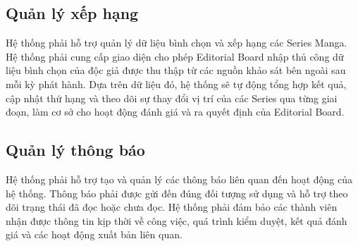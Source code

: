 \subsection{Quản lý xếp hạng}
Hệ thống phải hỗ trợ quản lý dữ liệu bình chọn và xếp hạng các Series Manga. Hệ thống phải cung cấp giao diện cho phép Editorial Board nhập thủ công dữ liệu bình chọn của độc giả được thu thập từ các nguồn khảo sát bên ngoài sau mỗi kỳ phát hành. Dựa trên dữ liệu đó, hệ thống sẽ tự động tổng hợp kết quả, cập nhật thứ hạng và theo dõi sự thay đổi vị trí của các Series qua từng giai đoạn, làm cơ sở cho hoạt động đánh giá và ra quyết định của Editorial Board.

\subsection{Quản lý thông báo}
Hệ thống phải hỗ trợ tạo và quản lý các thông báo liên quan đến hoạt động của hệ thống. Thông báo phải được gửi đến đúng đối tượng sử dụng và hỗ trợ theo dõi trạng thái đã đọc hoặc chưa đọc. Hệ thống phải đảm bảo các thành viên nhận được thông tin kịp thời về công việc, quá trình kiểm duyệt, kết quả đánh giá và các hoạt động xuất bản liên quan.
